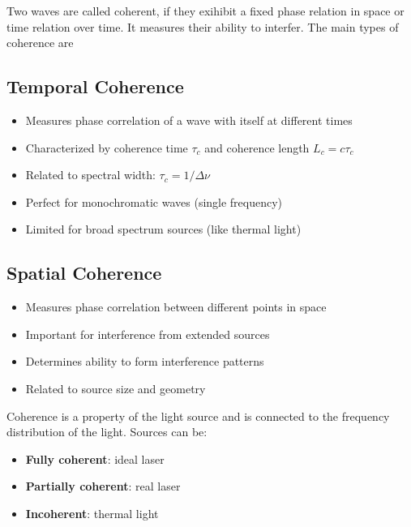 \documentclass[
  a4paper,
]{book}
\providecommand{\tightlist}{%
  \setlength{\itemsep}{0pt}\setlength{\parskip}{0pt}}
\begin{document}
\begin{tcolorbox}[enhanced jigsaw, breakable, toptitle=1mm, bottomrule=.15mm, colbacktitle=quarto-callout-note-color!10!white, title=\textcolor{quarto-callout-note-color}{\faInfo}\hspace{0.5em}{Coherence}, arc=.35mm, rightrule=.15mm, bottomtitle=1mm, opacityback=0, toprule=.15mm, coltitle=black, leftrule=.75mm, opacitybacktitle=0.6, colback=white, left=2mm, titlerule=0mm, colframe=quarto-callout-note-color-frame]

Two waves are called coherent, if they exihibit a fixed phase relation
in space or time relation over time. It measures their ability to
interfer. The main types of coherence are

\subsection{Temporal Coherence}\label{temporal-coherence}

\begin{itemize}
\tightlist
\item
  Measures phase correlation of a wave with itself at different times
\item
  Characterized by coherence time \(\tau_c\) and coherence length
  \(L_c = c\tau_c\)
\item
  Related to spectral width: \(\tau_c = 1/\Delta\nu\)
\item
  Perfect for monochromatic waves (single frequency)
\item
  Limited for broad spectrum sources (like thermal light)
\end{itemize}

\subsection{Spatial Coherence}\label{spatial-coherence}

\begin{itemize}
\tightlist
\item
  Measures phase correlation between different points in space
\item
  Important for interference from extended sources
\item
  Determines ability to form interference patterns
\item
  Related to source size and geometry
\end{itemize}

Coherence is a property of the light source and is connected to the
frequency distribution of the light. Sources can be:

\begin{itemize}
\tightlist
\item
  \textbf{Fully coherent}: ideal laser
\item
  \textbf{Partially coherent}: real laser
\item
  \textbf{Incoherent}: thermal light
\end{itemize}

\end{tcolorbox}
\end{document}
